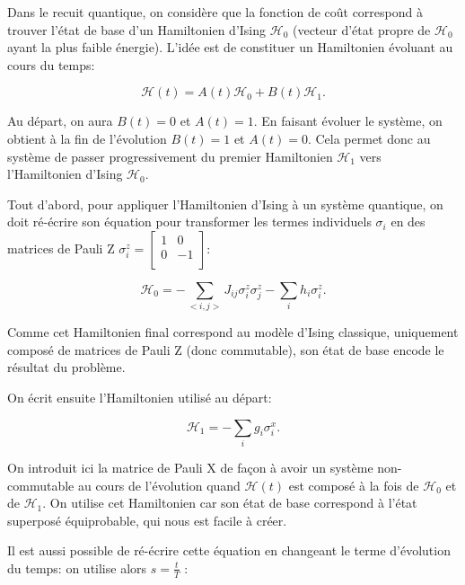 \documentclass[12pt,a4paper]{article}
\begin{document}
Dans le recuit quantique, on considère que la fonction de coût correspond à trouver l'état de base d'un Hamiltonien d'Ising $\mathcal{H}_0$ (vecteur d'état propre de $\mathcal{H}_0$ ayant la plus faible énergie). L'idée est de constituer un Hamiltonien évoluant au cours du temps:

\begin{equation}
    \mathcal{H}(t) = A(t) \mathcal{H}_0 + B(t) \mathcal{H}_1.
\end{equation}

Au départ, on aura $B(t) = 0$ et $A(t) = 1$. En faisant évoluer le système, on obtient à la fin de l'évolution $B(t) = 1$ et $A(t) = 0$. Cela permet donc au système de passer progressivement du premier Hamiltonien $\mathcal{H}_1$ vers l'Hamiltonien d'Ising $\mathcal{H}_0$.

Tout d'abord, pour appliquer l'Hamiltonien d'Ising à un système quantique, on doit ré-écrire son équation pour transformer les termes individuels $\sigma_i$ en des matrices de Pauli Z $\sigma_i^z = \begin{bmatrix} 1 & 0 \\ 0 & -1 \\ \end{bmatrix}$:

\begin{equation}
    \mathcal{H}_0 = -\displaystyle\sum_{<i, j>} J_{ij} \sigma_i^z \sigma_j^z - \displaystyle\sum_{i} h_i \sigma_i^z.
\end{equation}

Comme cet Hamiltonien final correspond au modèle d'Ising classique, uniquement composé de matrices de Pauli Z (donc commutable), son état de base encode le résultat du problème.

\medbreak

On écrit ensuite l'Hamiltonien utilisé au départ:

\begin{equation}
    \mathcal{H}_1 = - \displaystyle\sum_{i} g_i \sigma_i^x.
\end{equation}

On introduit ici la matrice de Pauli X de façon à avoir un système non-commutable au cours de l'évolution quand $\mathcal{H}(t)$ est composé à la fois de $\mathcal{H}_0$ et de $\mathcal{H}_1$. On utilise cet Hamiltonien car son état de base correspond à l'état superposé équiprobable, qui nous est facile à créer.

Il est aussi possible de ré-écrire cette équation en changeant le terme d'évolution du temps: on utilise alors $s = \frac{t}{T}$ :
\end{document}
